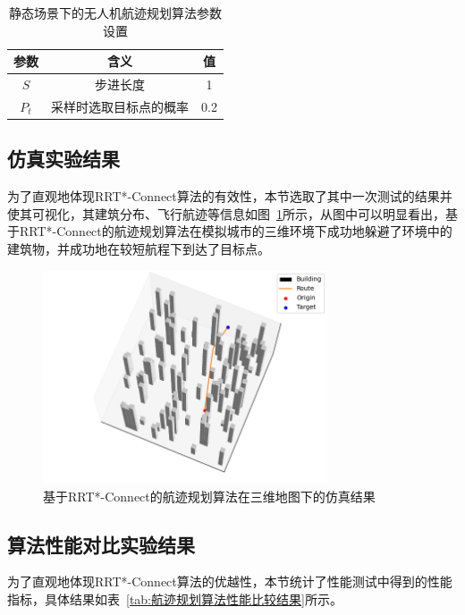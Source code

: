 \begin{table}[!htbp]
    \caption{静态场景下的无人机航迹规划算法参数设置}
    \label{tab:无人机航迹规划算法参数设置}
    \centering
    \begin{tabular}{c c c}
        \toprule
        \textbf{参数} & \textbf{含义} & \textbf{值}\\
        \midrule
        \( S \) & 步进长度 & 1\\
        \( P_t \) & 采样时选取目标点的概率 & 0.2\\
        \bottomrule
    \end{tabular}
\end{table}

\subsection{仿真实验结果}

为了直观地体现RRT*-Connect算法的有效性，本节选取了其中一次测试的结果并使其可视化，其建筑分布、飞行航迹等信息如图~\ref{fig:RRT*-Connect在三维地图下的仿真结果}所示，从图中可以明显看出，基于RRT*-Connect的航迹规划算法在模拟城市的三维环境下成功地躲避了环境中的建筑物，并成功地在较短航程下到达了目标点。

\begin{figure}[!htbp]
    \centering
    \includegraphics[width=0.75\textwidth]{./images/test_1_Connect_RRT_Star_1.png}
    \caption{基于RRT*-Connect的航迹规划算法在三维地图下的仿真结果}
    \label{fig:RRT*-Connect在三维地图下的仿真结果}
\end{figure}

\subsection{算法性能对比实验结果}

为了直观地体现RRT*-Connect算法的优越性，本节统计了性能测试中得到的性能指标，具体结果如表~\ref{tab:航迹规划算法性能比较结果}所示。

